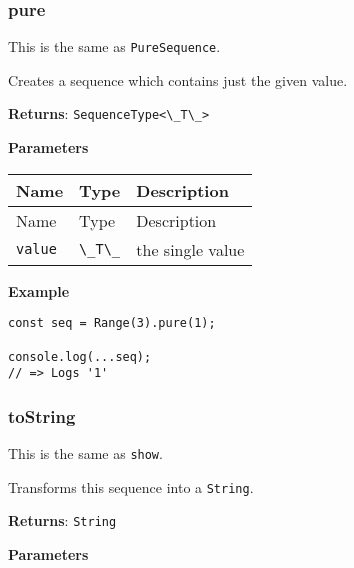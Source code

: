 \hypertarget{86a0c0de-ecd3-49d6-8e0a-454e59ba0722}{%
\subsubsection{pure}\label{86a0c0de-ecd3-49d6-8e0a-454e59ba0722}}

This is the same as \passthrough{\lstinline!PureSequence!}.

Creates a sequence which contains just the given value.

\textbf{Returns}: \passthrough{\lstinline!SequenceType<\_T\_>!}

\textbf{Parameters}

\begin{longtable}[]{
  >{\raggedright\arraybackslash}p{}
  >{\raggedright\arraybackslash}p{}
  >{\raggedright\arraybackslash}p{}@{}}

\toprule\noalign{}
Name & Type & Description \\
\midrule\noalign{}
\endfirsthead
\toprule\noalign{}
Name & Type & Description \\
\midrule\noalign{}
\endhead
\bottomrule\noalign{}
\endlastfoot
\passthrough{\lstinline!value!} & \passthrough{\lstinline!\_T\_!} & the
single value \\
\end{longtable}

\textbf{Example}

\begin{lstlisting}[label=b4b19961-9849-4688-8afe-9c635af8eda4]
const seq = Range(3).pure(1);
                            
console.log(...seq);
// => Logs '1'
\end{lstlisting}

\hypertarget{573dc5de-90b1-4591-8db4-da62a82d831b}{%
\subsubsection{toString}\label{573dc5de-90b1-4591-8db4-da62a82d831b}}

This is the same as \passthrough{\lstinline!show!}.

Transforms this sequence into a \passthrough{\lstinline!String!}.

\textbf{Returns}: \passthrough{\lstinline!String!}

\textbf{Parameters}

